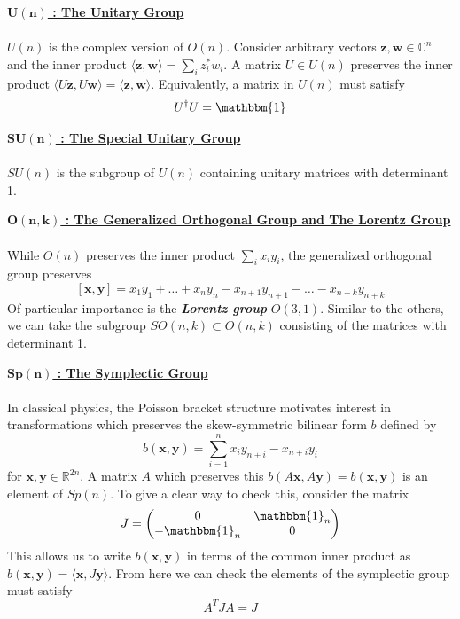 \documentclass[9 pt]{report}
\def\*#1{\boldsymbol{#1}}
\begin{document}
\begin{tcolorbox}
\underline{\textbf{$\*{U(n)}$ : The Unitary Group}}
\\
\\
$U(n)$ is the complex version of $O(n)$. Consider arbitrary vectors $\*z,\*w \in \mathbb{C}^n$ and the inner product $\langle\*z, \*w\rangle = \sum_i z^*_iw_i$. A matrix $U\in U(n)$ preserves the inner product $\langle U\*z, U\*w \rangle = \langle\*z, \*w\rangle$. Equivalently, a matrix in $U(n)$ must satisfy
$$ U^\dagger U = \mathbbm{1} $$
\end{tcolorbox}
\begin{tcolorbox}
\underline{\textbf{$\*{SU(n)}$ : The Special Unitary Group}}
\\
\\
$SU(n)$ is the subgroup of $U(n)$ containing unitary matrices with determinant 1.
\end{tcolorbox}
\begin{tcolorbox}
\underline{\textbf{$\*{O(n,k)}$ : The Generalized Orthogonal Group and The Lorentz Group}}
\\
\\
While $O(n)$ preserves the inner product $\sum_i x_iy_i$, the generalized orthogonal group preserves
$$[\*x, \*y] = x_1y_1 + \dots + x_ny_n - x_{n+1}y_{n+1} - \dots - x_{n+k}y_{n+k}$$
Of particular importance is the \textbf{\emph{Lorentz group}} $O(3,1)$. Similar to the others, we can take the subgroup $SO(n,k)\subset O(n,k)$ consisting of the matrices with determinant 1.
\end{tcolorbox}
\begin{tcolorbox}
\underline{\textbf{$\*{Sp(n)}$ : The Symplectic Group}}
\\
\\
In classical physics, the Poisson bracket structure motivates interest in transformations which preserves the skew-symmetric bilinear form $b$ defined by
$$ b(\*x,\*y) = \sum_{i=1}^n x_iy_{n+i} - x_{n+i}y_i $$
for $\*x,\*y \in \mathbb{R}^{2n}$. A matrix $A$ which preserves this $b(A\*x,A\*y) = b(\*x,\*y)$ is an element of $Sp(n)$. To give a clear way to check this, consider the matrix 
$$ J = \begin{pmatrix} 
		0 &\mathbbm{1}_n\\
		-\mathbbm{1}_n & 0\\
		\end{pmatrix} $$
This allows us to write $b(\*x,\*y)$ in terms of the common inner product as $b(\*x,\*y) = \langle\*x, J\*y\rangle$. From here we can check the elements of the symplectic group must satisfy
$$ A^TJA = J $$
\end{tcolorbox}
\end{document}
